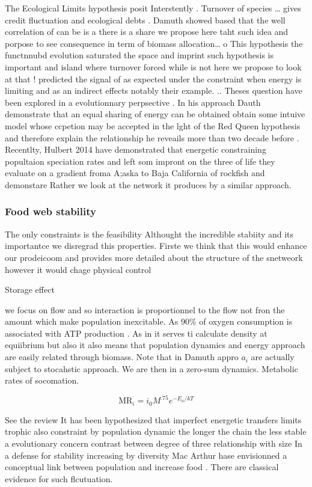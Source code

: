 The Ecological Limits hypothesis posit Interstently \citet{Rabosky2015}.
Turnover of species \ldots{} gives credit fluctuation and ecological
debts . Damuth showed based that the well correlation of can be is a
there is a share we propose here taht such idea and porpose to see
consequence in term of biomass allocation\ldots{} o This hypothesis the
functnnubd evolution saturated the space and imprint such hypothesis is
important and island where turnover forced while is not here we propose
to look at that ! \citet{Hurlbert2014} predicted the signal of as
expected under the constraint when energy is limiting and as an indirect
effects notably their example. .. Theses question have been explored in
a evolutionnary perpsective
\citep{Damuth2007, Hurlbert2014, Rabosky2015}. In his approach Dauth
demonstrate that an equal sharing of energy can be obtained obtain some
intuive model whose ccpetion may be accepted in the lght of the Red
Queen hypothesis and therefore explain the relationship he reveails more
than two decade before \citet{Damuth1981}. Recentlty, Hulbert 2014 have
demonstrated that energetic constraining popultaion speciation rates and
left som impront on the three of life they evaluate on a gradient froma
A;aska to Baja California of rockfish and demonstare Rather we look at
the network it produces by a similar approach.

\subsubsection{Food web stability}\label{food-web-stability}

The only constraints is the feasibility Althought the incredible
stabiity and its importantce we disregrad this properties. Firste we
think that this would enhance our prodeicoom and provides more detailed
about the structure of the snetweork however it would chage physical
control

Storage effect

we focus on flow and so interaction is proportionnel to the flow not
fron the amount which make population inexcitable. As 90\% of oxygen
consumption is associated with ATP production \citet{White2013}. As in
\citet{Damuth2007} it serves ti calculate density at equiibrium but also
it also means that population dynamics and energy approach are easily
related through biomass. Note that in Damuth appro \(a_i\) are actually
subject to stocahstic approach. We are then in a zero-sum dynamics.
Metabolic rates of socomation.

\[\text{MR}_{i}=i_0M^{.75}e^{-E_a/kT}\]

See the review \citet{Post2002} It has been hypothesized that imperfect
energetic transfers limits trophic also constraint by population dynamic
the longer the chain the less stable \citet{Pimm1978} a evolutionary
concern \citet{hastings1979} contrast between degree of three
relationship with size In a defense for stability increasing by
diversity Mac Arthur hase envisionned a conceptual link between
population and increase food \citet{MacArthur1955}. There are classical
evidence for such flcutuation.
